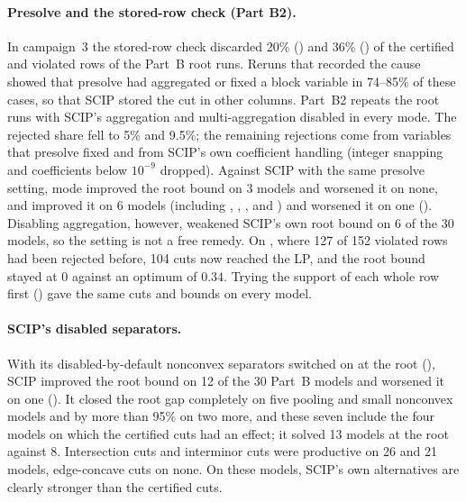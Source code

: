 \paragraph{Presolve and the stored-row check (Part B2).} In campaign~3 the
stored-row check discarded 20\% () and 36\% () of the
certified and violated rows of the Part~B root runs. Reruns that recorded the
cause showed that presolve had aggregated or fixed a block variable in 74--85\%
of these cases, so that SCIP stored the cut in other columns. Part~B2 repeats
the root runs with SCIP's aggregation and multi-aggregation disabled in every
mode. The rejected share fell to 5\% and 9.5\%; the remaining rejections come
from variables that presolve fixed and from SCIP's own coefficient handling
(integer snapping and coefficients below $10^{-9}$ dropped). Against SCIP with
the same presolve setting, mode  improved the root bound on 3 models
and worsened it on none, and  improved it on 6 models
(including , ,
,  and ) and worsened it on one
(). Disabling aggregation, however, weakened SCIP's
own root bound on 6 of the 30 models, so the setting is not a free remedy. On
, where 127 of 152 violated rows had been
rejected before, 104 cuts now reached the LP, and the root bound stayed at $0$
against an optimum of $0.34$. Trying the support of each whole row first
() gave the same cuts and bounds on every model.

\paragraph{SCIP's disabled separators.} With its disabled-by-default nonconvex
separators switched on at the root (), SCIP improved the
root bound on 12 of the 30 Part~B models and worsened it on one
(). It closed the root gap completely on five pooling and small
nonconvex models and by more than 95\% on two more, and these seven include
the four models on which the certified cuts had an effect; it solved 13 models
at the root against 8. Intersection cuts and interminor cuts were productive
on 26 and 21 models, edge-concave cuts on none. On these models, SCIP's own
alternatives are clearly stronger than the certified cuts.

